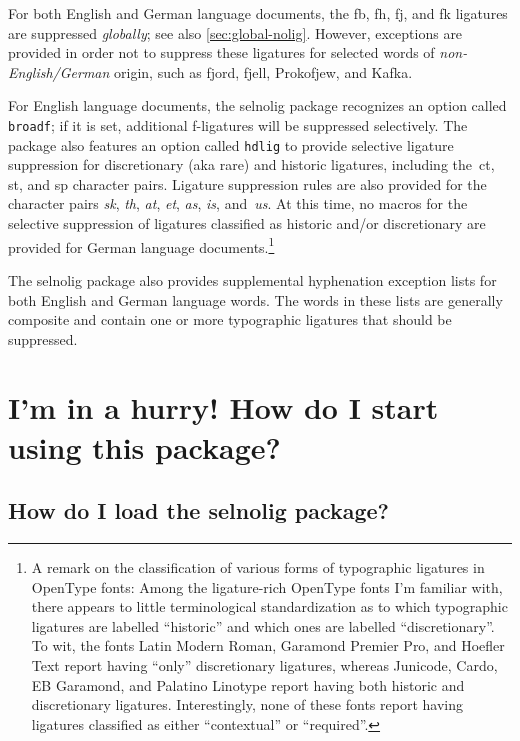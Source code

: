 \documentclass[11pt]{article}
\newcommand{\pkg}[1]{\textsf{#1}}
\newcommand{\opt}[1]{\texttt{#1}}
\begin{document}
For both English and German language documents, the \mbox{fb}, \mbox{fh}, \mbox{fj}, and \mbox{fk} ligatures are suppressed \emph{globally}; see also \cref{sec:global-nolig}. However, exceptions are provided in order not to suppress these ligatures for selected words of \emph{non-English\slash German} origin, such as fjord, fjell, Prokofjew, and Kafka.

For English language documents, the \pkg{selnolig} package recognizes an option called \opt{broadf}; if it is set, additional f-ligatures will be suppressed selectively. The package also features an option called \opt{hdlig} to provide selective ligature suppression for discretionary (aka rare) and historic ligatures, including the~ct, st, and sp character pairs. Ligature suppression rules are also provided for the character pairs {\ebg\emph{sk}}, \emph{th}, \emph{at}, \emph{et}, \emph{as}, \emph{is}, and~\emph{us}. At this time, no macros for the selective suppression of ligatures classified as historic and/or discretionary are provided for German language documents.\footnote{A remark on the classification of various forms of typographic ligatures in OpenType fonts: Among the ligature-rich OpenType fonts I'm familiar with, there appears to little terminological standardization as to which typographic ligatures are labelled \enquote{historic} and which ones are labelled \enquote{discretionary}. To wit, the fonts Latin Modern Roman, Garamond Premier Pro, and Hoefler Text report having \enquote{only} discretionary ligatures, whereas Junicode, Cardo, EB Garamond, and Palatino Linotype report having both historic and discretionary ligatures. Interestingly, none of these fonts report having ligatures classified as either \enquote{contextual} or \enquote{required}. }

The \pkg{selnolig} package also provides supplemental hyphenation exception lists for both English and German language words. The words in these lists are generally composite and contain one or more typographic ligatures that should be suppressed.





\section{I'm in a hurry! How do I start using this package?}

\subsection[How do I load the selnolig package?]{How do I load the \pkg{selnolig} package?}
\end{document}
